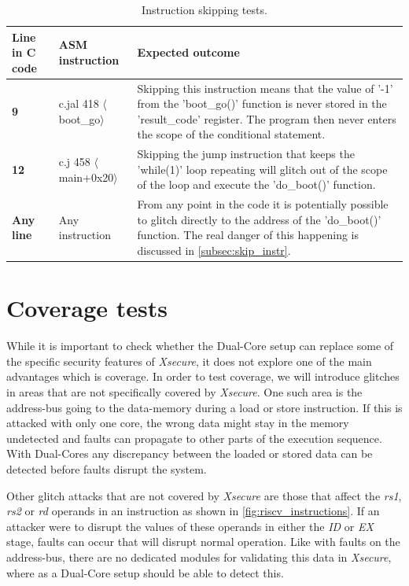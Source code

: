 \begin{table}[h]
\centering
\caption{Instruction skipping tests.}
\label{tab:instr_skip_test}
\begin{tabular}{m{2.5cm}m{3.5cm}m{7.5cm}}
\toprule 
Line in C code & ASM instruction & Expected outcome \\
\midrule
\rowcolor{black!20} \textbf{9} & c.jal 418 $\langle$boot\_go$\rangle$ & Skipping this instruction means that the value of '-1' from the 'boot\_go()' function is never stored in the 'result\_code' register. The program then never enters the scope of the conditional statement. \\
\textbf{12} & c.j 458 $\langle$main+0x20$\rangle$ & Skipping the jump instruction that keeps the 'while(1)' loop repeating will glitch out of the scope of the loop and execute the 'do\_boot()' function.  \\
\rowcolor{black!20} \textbf{Any line} & Any instruction & From any point in the code it is potentially possible to glitch directly to the address of the 'do\_boot()' function. The real danger of this happening is discussed in \autoref{subsec:skip_instr}. \\
\bottomrule
\end{tabular}
\end{table}

\section{Coverage tests}
\label{sec:coverage_test}

While it is important to check whether the Dual-Core setup can replace some of the specific security features of \textit{Xsecure}, it does not explore one of the main advantages which is coverage. In order to test coverage, we will introduce glitches in areas that are not specifically covered by \textit{Xsecure}. One such area is the address-bus going to the data-memory during a load or store instruction. If this is attacked with only one core, the wrong data might stay in the memory undetected and faults can propagate to other parts of the execution sequence. With Dual-Cores any discrepancy between the loaded or stored data can be detected before faults disrupt the system. 

Other glitch attacks that are not covered by \textit{Xsecure} are those that affect the \textit{rs1}, \textit{rs2} or \textit{rd} operands in an instruction as shown in \autoref{fig:riscv_instructions}. If an attacker were to disrupt the values of these operands in either the \textit{ID} or \textit{EX} stage, faults can occur that will disrupt normal operation. Like with faults on the address-bus, there are no dedicated modules for validating this data in \textit{Xsecure}, where as a Dual-Core setup should be able to detect this.


